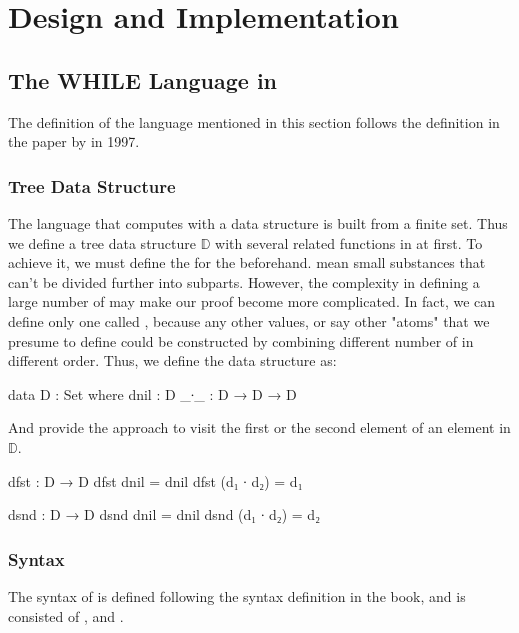 \chapter{Design and Implementation}

\section{The WHILE Language in \Agda}\label{definition: while}
The definition of the \WHILE language mentioned in this section follows the definition in the paper  by  in 1997\cite{jones_computability_1997}.
\subsection{Tree Data Structure}\label{definition: D}
The language \WHILE that computes with a  data structure is built from a finite set. 
Thus we define a tree data structure $\mathds{D}$ with several related functions in \Agda at first.
To achieve it, we must define the  for the  beforehand.
 mean small substances that can't be divided further into subparts.
However, the complexity in defining a large number of  may make our proof become more complicated.
In fact, we can define only one  called , because any other values, or say other "atoms" that we presume to define could be constructed by combining different number of  in different order.
Thus, we define the data structure as:
\begin{code}
data D : Set where
  dnil : D 
  _∙_  : D → D → D
\end{code}
And provide the approach to visit the first or the second element of an element in $\mathds{D}$.
\begin{code}
dfst : D → D
dfst dnil = dnil
dfst (d₁ ∙ d₂) = d₁

dsnd : D → D
dsnd dnil = dnil
dsnd (d₁ ∙ d₂) = d₂
\end{code}

\subsection{Syntax}\label{definition: syntax}
The syntax of \WHILE is defined following the syntax definition in the book\cite{jones_computability_1997}, and is consisted of ,  and .

